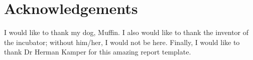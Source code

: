 \chapter*{Acknowledgements}
\makeatletter{}\makeatother

I would like to thank my dog, Muffin. I also would like to thank the inventor of the incubator; without him/her, I would not be here. Finally, I would like to thank Dr Herman Kamper for this amazing report template.